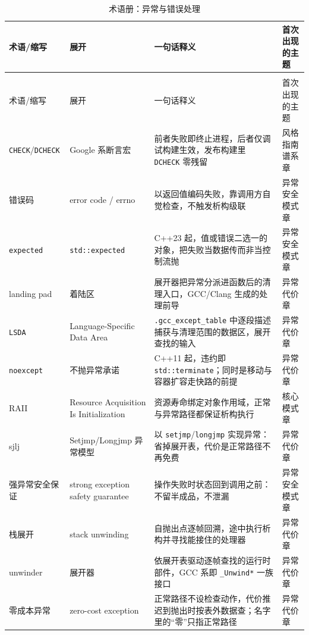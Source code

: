 \documentclass[12pt,a4paper,fontset=fandol]{ctexbook}
\newcommand{\cpp}[1]{C++#1}
\newcommand{\Tp}[1]{\texttt{#1}}
\newcommand{\Bk}{\discretionary{}{}{}}
\begin{document}
\begin{longtable}{@{}>{\raggedright\arraybackslash}p{}
                  >{\raggedright\arraybackslash}p{}
                  >{\raggedright\arraybackslash}p{}
                  >{\raggedright\arraybackslash}p{}@{}}
\caption{术语册：异常与错误处理}\label{tab:apA-exc}\\
\toprule
术语/缩写 & 展开 & 一句话释义 & 首次出现的主题 \\
\midrule
\endfirsthead
\multicolumn{4}{@{}l}{表~\thetable\ （续）}\\
\toprule
术语/缩写 & 展开 & 一句话释义 & 首次出现的主题 \\
\midrule
\endhead
\bottomrule
\endlastfoot
\Tp{CHECK}/{\Bk}\Tp{DCHECK} & Google 系断言宏 & 前者失败即终止进程，后者仅调试构建生效，发布构建里 \Tp{DCHECK} 零残留 & 风格指南谱系章 \\
错误码 & error code / errno & 以返回值编码失败，靠调用方自觉检查，不触发析构级联 & 异常安全模式章 \\
\Tp{expected} & \Tp{std::expected} & \cpp{23} 起，值或错误二选一的对象，把失败当数据传而非当控制流抛 & 异常安全模式章 \\
landing pad & 着陆区 & 展开器把异常分派进函数后的清理入口，GCC/Clang 生成的处理前导 & 异常代价章 \\
\Tp{LSDA} & Language-Specific Data Area & \Tp{.gcc{\Bk}\_except{\Bk}\_table} 中逐段描述捕获与清理范围的数据区，展开查找的输入 & 异常代价章 \\
\Tp{noexcept} & 不抛异常承诺 & \cpp{11} 起，违约即 \Tp{std::terminate}；同时是移动与容器扩容走快路的前提 & 异常代价章 \\
RAII & Resource Acquisition Is Initialization & 资源寿命绑定对象作用域，正常与异常路径都保证析构执行 & 核心模式章 \\
sjlj & Setjmp/Longjmp 异常模型 & 以 \Tp{setjmp}/{\Bk}\Tp{longjmp} 实现异常：省掉展开表，代价是正常路径不再免费 & 异常代价章 \\
强异常安全保证 & strong exception safety guarantee & 操作失败时状态回到调用之前：不留半成品，不泄漏 & 异常安全模式章 \\
栈展开 & stack unwinding & 自抛出点逐帧回溯，途中执行析构并寻找能接住的处理器 & 异常代价章 \\
unwinder & 展开器 & 依展开表驱动逐帧查找的运行时部件，GCC 系即 \Tp{\_Unwind{\Bk}*} 一族接口 & 异常代价章 \\
零成本异常 & zero-cost exception & 正常路径不设检查动作，代价推迟到抛出时按表外数据查；名字里的``零''只指正常路径 & 异常代价章 \\
\end{longtable}
\end{document}
